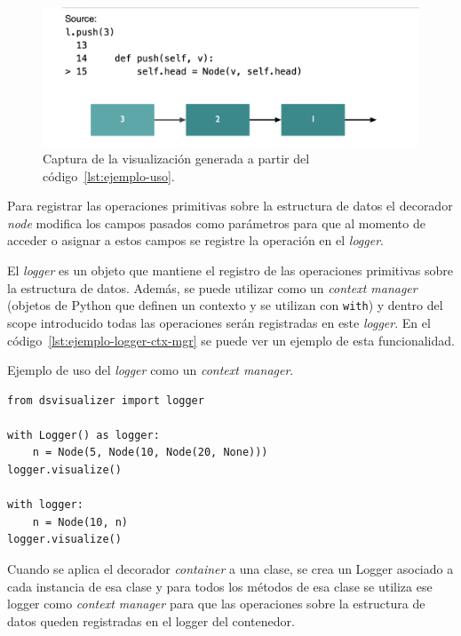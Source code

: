 \begin{figure}[htb]
    \centering
    \includegraphics[width=\linewidth]{imagenes/ejemplos/ejemplo}
    \caption{Captura de la visualización generada a partir del código~\ref{lst:ejemplo-uso}.}
    \label{fig:visualizacion_ej}
    \centering
\end{figure}

Para registrar las operaciones primitivas sobre la estructura de datos el decorador \textit{node} modifica los campos pasados como parámetros para que al momento de acceder o asignar a estos campos se registre la operación en el \textit{logger}.

El \textit{logger} es un objeto que mantiene el registro de las operaciones primitivas sobre la estructura de datos. Además, se puede utilizar como un \textit{context manager} (objetos de Python que definen un contexto y se utilizan con \texttt{with}) y dentro del scope introducido todas las operaciones serán registradas en este \textit{logger}. En el código~\ref{lst:ejemplo-logger-ctx-mgr} se puede ver un ejemplo de esta funcionalidad.

\begin{listing}[htb]
\caption{Ejemplo de uso del \textit{logger} como un \textit{context manager}.}
\label{lst:ejemplo-logger-ctx-mgr}
\begin{verbatim}
from dsvisualizer import logger

with Logger() as logger:
    n = Node(5, Node(10, Node(20, None)))
logger.visualize()

with logger:
    n = Node(10, n)
logger.visualize()
\end{verbatim}
\end{listing}

Cuando se aplica el decorador \textit{container} a una clase, se crea un Logger asociado a cada instancia de esa clase y para todos los métodos de esa clase se utiliza ese logger como \textit{context manager} para que las operaciones sobre la estructura de datos queden registradas en el logger del contenedor.

